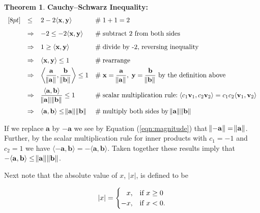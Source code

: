\documentclass{article}
\theoremstyle{definition}
\newtheorem{theorem}{Theorem}[section]
\begin{document}
\begin{theorem} {\bf Cauchy–Schwarz Inequality:}
\begin{equation*}
\begin{array}{lllll}
[8pt]
&\leq& 2- 2 \langle \mathbf{x},\mathbf{y} \rangle
					&\mathrel{\#} 1 + 1 = 2 \\
[8pt]
&\Rightarrow& -2 \leq -2 \langle \mathbf{x},\mathbf{y} \rangle
					&\mathrel{\#} \text{subtract 2 from both sides}  \\
[8pt]
&\Rightarrow& 1 \geq \langle \mathbf{x},\mathbf{y} \rangle 
					&\mathrel{\#} \text{divide by -2, reversing inequality}  \\
[8pt]
&\Rightarrow& \langle \mathbf{x},\mathbf{y} \rangle \leq 1
					&\mathrel{\#} \text{rearrange}  \\
[4pt]
&\Rightarrow& \left \langle \dfrac{\mathbf{a}}{\norm{\mathbf{a}}}, 
					{\dfrac{\mathbf{b}}{\norm{\mathbf{b}}}} \right\rangle \leq 1
					&\mathrel{\#} \text{$\mathbf{x} 
					= \dfrac{\mathbf{a}}{\norm{\mathbf{a}}}, \; \mathbf{y} 
					= \dfrac{\mathbf{b}}{\norm{\mathbf{b}}}$ by the definition above} \\
[12pt]
&\Rightarrow& \dfrac{\langle \mathbf{a},\mathbf{b} \rangle}{\norm{\mathbf{a}} \norm{\mathbf{b}}} \leq 1
					&\mathrel{\#} \text{scalar multiplication rule:
					$\! \langle c_{1}\mathbf{v}_1, c_{2}\mathbf{v}_2 \rangle 
					= c_{1} c_{2} \langle \mathbf{v}_1, \mathbf{v}_2 \rangle$} \\
[12pt]
&\Rightarrow& \langle \mathbf{a},\mathbf{b} \rangle \leq \norm{\mathbf{a}}\norm{\mathbf{b}}
					&\mathrel{\#} \text{multiply both sides by 
					$\norm{\mathbf{a}} \norm{\mathbf{b}}$}

\end{array}
\end{equation*}

\bigskip
\noindent
If we replace $\mathbf{a}$ by $-\mathbf{a}$ we see by Equation
(\ref{eqn:magnitude}) that $\norm{-\mathbf{a}} = \norm{\mathbf{a}}$. 
Further, by the scalar multiplication rule for inner
products with $c_1 = -1$ and $c_2 = 1$ we have $\langle
-\mathbf{a},\mathbf{b} \rangle = - \langle \mathbf{a},\mathbf{b}
\rangle$. Taken together these results imply that $- \langle
\mathbf{a},\mathbf{b} \rangle \leq \norm{\mathbf{a}} 
\norm{\mathbf{b}}$.


\bigskip
\noindent
Next note that the absolute value of $x$, $|x|$,
is defined to be

\bigskip
\begin{equation}
|x| = {
  \begin{cases}\hfill x, & {\text{if }} x \geq 0 \\
                     -x, & {\text{if }} x < 0.
  \end{cases}
}
\label{eqn:absolute_value}
\end{equation}



\end{theorem}
\end{document}
